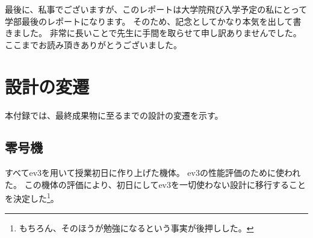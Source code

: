 \documentclass{ltjsreport}
\begin{document}
最後に、私事でございますが、このレポートは大学院飛び入学予定の私にとって学部最後のレポートになります。
そのため、記念としてかなり本気を出して書きました。
非常に長いことで先生に手間を取らせて申し訳ありませんでした。
ここまでお読み頂きありがとうございました。























\appendix






\chapter{設計の変遷}
本付録では、最終成果物に至るまでの設計の変遷を示す。

\section{零号機}
すべてev3を用いて授業初日に作り上げた機体。
ev3の性能評価のために使われた。
この機体の評価により、初日にしてev3を一切使わない設計に移行することを決定した\footnote{もちろん、そのほうが勉強になるという事実が後押しした。}。
\end{document}
